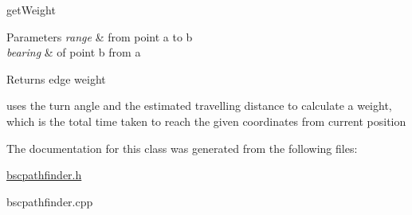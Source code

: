 get\+Weight 


\begin{DoxyParams}{Parameters}
{\em range} & from point a to b \\
\hline
{\em bearing} & of point b from a \\
\hline
\end{DoxyParams}
\begin{DoxyReturn}{Returns}
edge weight
\end{DoxyReturn}
uses the turn angle and the estimated travelling distance to calculate a weight, which is the total time taken to reach the given coordinates from current position 

The documentation for this class was generated from the following files\+:\begin{DoxyCompactItemize}
\item 
\hyperlink{bscpathfinder_8h}{bscpathfinder.\+h}\item 
bscpathfinder.\+cpp\end{DoxyCompactItemize}
